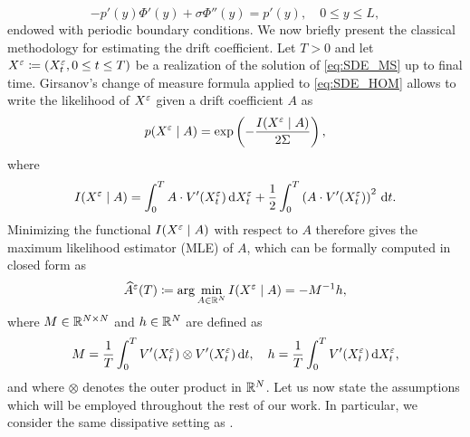 \documentclass[10pt]{article}
\begin{document}
\begin{equation}\label{eq:CellProblem}
	-p'(y)\Phi'(y) + \sigma \Phi''(y) = p'(y), \quad 0 \leq y \leq L,
\end{equation}
endowed with periodic boundary conditions. 
We now briefly present the classical methodology for estimating the drift coefficient. Let $T > 0$ and let $X^\varepsilon \coloneqq (X^\varepsilon_t, 0\leq t \leq T)$ be a realization of the solution of \eqref{eq:SDE_MS} up to final time. Girsanov's change of measure formula applied to \eqref{eq:SDE_HOM} allows to write the likelihood of $X^\varepsilon$ given a drift coefficient $A$ as
\begin{equation}\label{eq:Likelihood}
p(X^\varepsilon \mid A) = \exp\left(-\frac{I(X^\varepsilon\mid A)}{2\Sigma} \right), 
\end{equation}
where 
\begin{equation}
I(X^\varepsilon \mid A) = \int_0^T A \cdot V'(X^\varepsilon_t) \,\mathrm{d} X^\varepsilon_t + \frac12 \int_0^T \left( A \cdot V'(X^\varepsilon_t) \right)^2 \,\mathrm{d} t.
\end{equation}
Minimizing the functional $I(X^\varepsilon \mid A)$ with respect to $A$ therefore gives the maximum likelihood estimator (MLE) of $A$, which can be formally computed in closed form as
\begin{equation}\label{eq:MLE}
	\widehat A^\varepsilon(T) \coloneqq \arg \min_{A \in \mathbb{R}^N} I(X^\varepsilon \mid A) = - M^{-1}h,
\end{equation}
where $M\in\mathbb{R}^{N\times N}$ and $h\in\mathbb{R}^N$ are defined as
\begin{equation}\label{eq:MandH}
M = \frac1T \int_0^T V'(X^\varepsilon_t) \otimes V'(X^\varepsilon_t) \,\mathrm{d} t, \quad h = \frac1T \int_0^T V'(X^\varepsilon_t) \,\mathrm{d} X^\varepsilon_t,
\end{equation}
and where $\otimes$ denotes the outer product in $\mathbb{R}^N$. Let us now state the assumptions which will be employed throughout the rest of our work. In particular, we consider the same dissipative setting as \cite[Assumption 3.1]{PaS07}.
\end{document}
